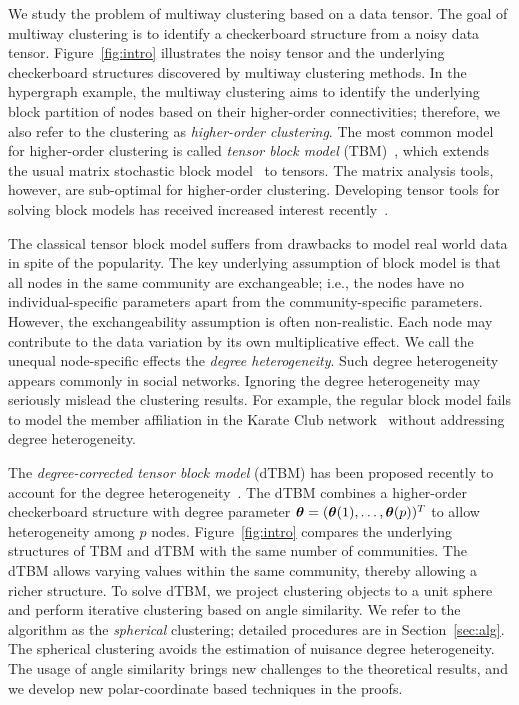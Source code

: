 \documentclass[journal]{IEEEtran}
\theoremstyle{definition}
\theoremstyle{definition}
\begin{document}
We study the problem of multiway clustering based on a data tensor. The goal of multiway clustering is to identify a checkerboard structure from a noisy data tensor. Figure~\ref{fig:intro} illustrates the noisy tensor and the underlying checkerboard structures discovered by multiway clustering methods. In the hypergraph example, the multiway clustering aims to identify the underlying block partition of nodes based on their higher-order connectivities; therefore, we also refer to the clustering as \emph{higher-order clustering}. The most common model for higher-order clustering is called \emph{tensor block model} (TBM)~\citep{wang2019multiway}, which extends the usual matrix stochastic block model~\citep{abbe2017community} to tensors. The matrix analysis tools, however, are sub-optimal for higher-order clustering. Developing tensor tools for solving block models has received increased interest recently~\citep{ wang2019multiway,chi2020provable,han2020exact}. 

The classical tensor block model suffers from drawbacks to model real world data in spite of the popularity. The key underlying assumption of block model is that all nodes in the same community are exchangeable; i.e., the nodes have no individual-specific parameters apart from the community-specific parameters. However, the exchangeability assumption is often non-realistic. Each node may contribute to the data variation by its own multiplicative effect. We call the unequal node-specific effects the \emph{degree heterogeneity}. Such degree heterogeneity appears commonly in social networks. Ignoring the degree heterogeneity may seriously mislead the clustering results. For example, the regular block model fails to model the member affiliation in the Karate Club network~\citep{bickel2009nonparametric} without addressing degree heterogeneity. 

The \emph{degree-corrected tensor block model} (dTBM) has been proposed recently to account for the degree heterogeneity~\citep{ke2019community}. The dTBM combines a higher-order checkerboard structure with degree parameter $\boldsymbol{\theta}=(\boldsymbol{\theta}(1),\ldots,\boldsymbol{\theta}(p))^T$ to allow heterogeneity among $p$ nodes.  Figure~\ref{fig:intro} compares the underlying structures of TBM and dTBM with the same number of communities. The dTBM allows varying values within the same community, thereby allowing a richer structure. To solve dTBM, we project clustering objects to a unit sphere and perform iterative clustering based on angle similarity. We refer to the algorithm as the \textit{spherical} clustering; detailed procedures are in Section~\ref{sec:alg}. The spherical clustering avoids the estimation of nuisance degree heterogeneity. The usage of angle similarity brings new challenges to the theoretical results, and we develop new polar-coordinate based techniques in the proofs. 
\end{document}
